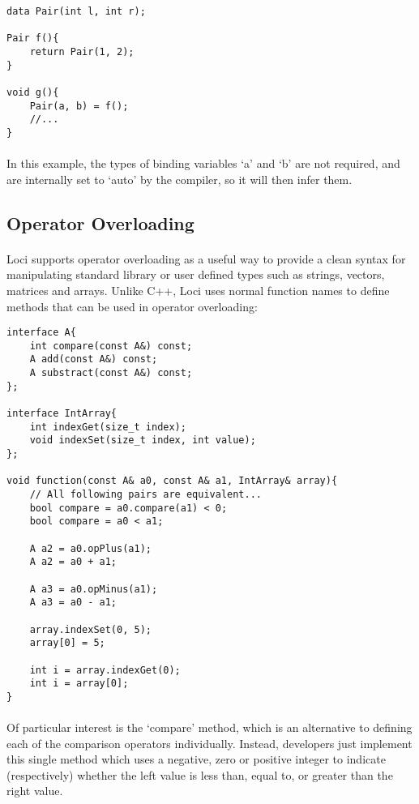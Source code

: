 \documentclass[12pt,twoside,notitlepage]{report}
\begin{document}
\begin{lstlisting}
data Pair(int l, int r);

Pair f(){
	return Pair(1, 2);
}

void g(){
	Pair(a, b) = f();
	//...
}
\end{lstlisting}

\paragraph{}
In this example, the types of binding variables `a' and `b' are not required, and are internally set to `auto' by the compiler, so it will then infer them.

\clearpage

\subsection{Operator Overloading}

\paragraph{}
Loci supports operator overloading as a useful way to provide a clean syntax for manipulating standard library or user defined types such as strings, vectors, matrices and arrays. Unlike C++, Loci uses normal function names to define methods that can be used in operator overloading:


\begin{lstlisting}
interface A{
	int compare(const A&) const;
	A add(const A&) const;
	A substract(const A&) const;
};

interface IntArray{
	int indexGet(size_t index);
	void indexSet(size_t index, int value);
};

void function(const A& a0, const A& a1, IntArray& array){
	// All following pairs are equivalent...
	bool compare = a0.compare(a1) < 0;
	bool compare = a0 < a1;
	
	A a2 = a0.opPlus(a1);
	A a2 = a0 + a1;
	
	A a3 = a0.opMinus(a1);
	A a3 = a0 - a1;
	
	array.indexSet(0, 5);
	array[0] = 5;
	
	int i = array.indexGet(0);
	int i = array[0];
}
\end{lstlisting}

\paragraph{}
Of particular interest is the `compare' method, which is an alternative to defining each of the comparison operators individually. Instead, developers just implement this single method which uses a negative, zero or positive integer to indicate (respectively) whether the left value is less than, equal to, or greater than the right value.
\end{document}
